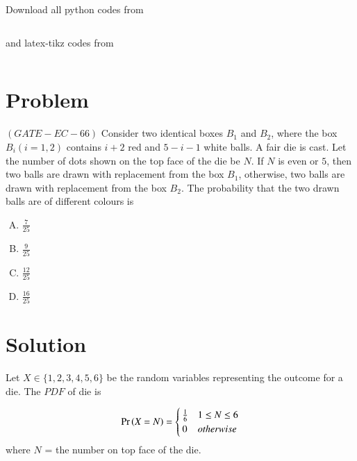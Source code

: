 \documentclass[journal,12pt,twocolumn]{IEEEtran}
\begin{document}
Download all python codes from 
\begin{lstlisting}

\end{lstlisting}

and latex-tikz codes from
\begin{lstlisting}

\end{lstlisting}

\section{Problem}

$(GATE-EC-66)$ Consider two identical boxes $B_1$ and $B_2$, where the box $B_i(i = 1, 2)$ contains $i + 2$ red and $5−i−1$ white balls. A fair die is cast. Let the number of dots shown on the top face of the die be $N$. If $N$ is even or $5$, then two balls are drawn with replacement from the box $B_1$, otherwise, two balls are drawn with replacement from the box $B_2$. The probability that the two drawn balls are of different colours is

\begin{enumerate}[(A)]
    \item $\frac{7}{25}$ \\
    
    \item $\frac{9}{25}$ \\
    
    \item $\frac{12}{25}$ \\
    
    \item $\frac{16}{25}$
\end{enumerate}

\section{Solution}

Let $X \in \{1,2,3,4,5,6\}$ be the random variables representing the outcome for a die. The $PDF$ of die is

\begin{align}
    \Pr\left(X=N\right) =
    \begin{cases}
    \frac{1}{6} & 1 \leq N \leq 6\\
    0 & otherwise
    \end{cases}
\end{align}
where $N$ = the number on top face of the die.
\end{document}
